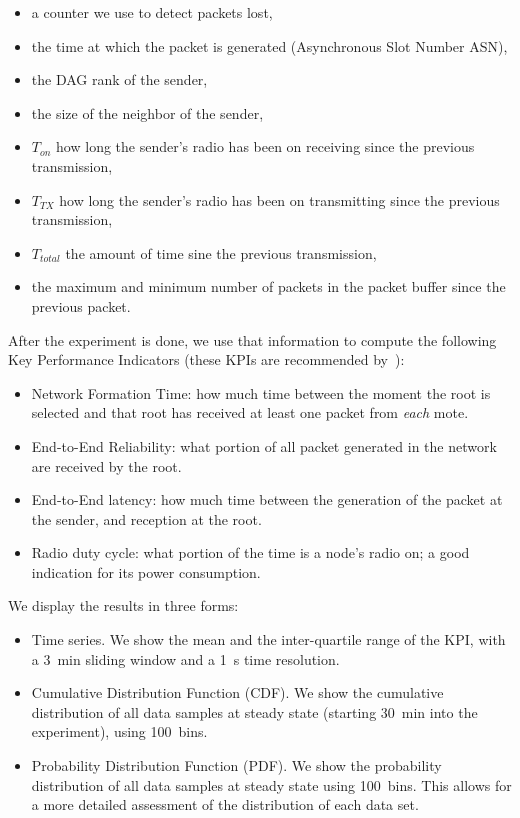 \documentclass[sensors,article,submit,moreauthors,pdftex]{Definitions/mdpi}
\begin{document}
\begin{itemize}
    \item a counter we use to detect packets lost,
    \item the time at which the packet is generated (Asynchronous Slot Number ASN),
    \item the DAG rank of the sender,
    \item the size of the neighbor of the sender,
    \item $T_{on}$ how long the sender's radio has been on receiving since the previous transmission,
    \item $T_{TX}$ how long the sender's radio has been on transmitting since the previous transmission,
    \item $T_{total}$ the amount of time sine the previous transmission,
    \item the maximum and minimum number of packets in the packet buffer since the previous packet.
\end{itemize}


After the experiment is done, we use that information to compute the following Key Performance Indicators (these KPIs are recommended by~\cite{vucinic20key}):

\begin{itemize}
    \item Network Formation Time:
        how much time between the moment the root is selected and that root has received at least one packet from \textit{each} mote. 
    \item End-to-End Reliability:
        what portion of all packet generated in the network are received by the root. 
    \item End-to-End latency:
        how much time between the generation of the packet at the sender, and reception at the root.
    \item Radio duty cycle:
        what portion of the time is a node's radio on; a good indication for its power consumption.
\end{itemize}


We display the results in three forms:

\begin{itemize}
    \item Time series.
        We show the mean and the inter-quartile range of the KPI,
            with a 3~min sliding window and a 1~s time resolution. 
    \item Cumulative Distribution Function (CDF).
        We show the cumulative distribution of all data samples at steady state (starting 30~min into the experiment), using 100~bins.
    \item Probability Distribution Function (PDF).
        We show the probability distribution of all data samples at steady state using 100~bins.
        This allows for a more detailed assessment of the distribution of each data set. 
\end{itemize}
\end{document}
